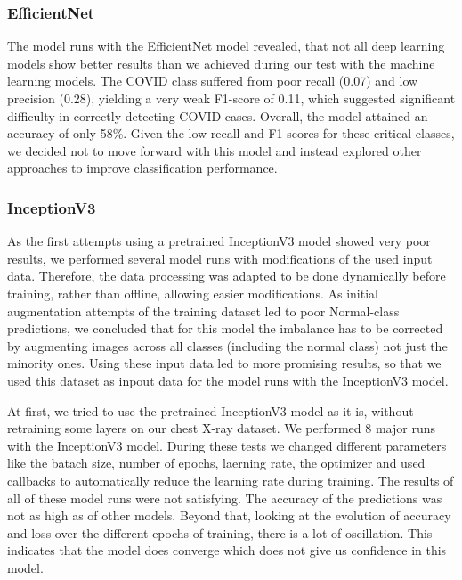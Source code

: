 \documentclass{article}
\begin{document}
\subsubsection{EfficientNet} 
The model runs with the EfficientNet model revealed, that not all deep learning models show better results than we achieved during our test with the machine learning models. 
The COVID class suffered from poor recall (0.07) and low precision (0.28), yielding a very weak F1-score of 0.11, which suggested significant difficulty in correctly detecting COVID cases. Overall, the model attained an accuracy of only 58\%. Given the low recall and F1-scores for these critical classes, we decided not to move forward with this model and instead explored other approaches to improve classification performance.


\subsubsection{InceptionV3} \label{section:InceptionV3}

As the first attempts using a pretrained InceptionV3 model showed very poor results, we performed several model runs with modifications of the used input data. Therefore, the data processing was adapted to be done dynamically before training, rather than offline, allowing easier modifications. As initial augmentation attempts of the training dataset led to poor Normal-class predictions, we concluded that for this model the imbalance has to be corrected by augmenting images across all classes (including the normal class) not just the minority ones. Using these input data led to more promising results, so that we used this dataset as inpout data for the model runs with the InceptionV3 model. 

At first, we tried to use the pretrained InceptionV3 model as it is, without retraining some layers on our chest X-ray dataset. We performed 8 major runs with the InceptionV3 model. During these tests we changed different parameters like the batach size, number of epochs, laerning rate, the optimizer and used callbacks to automatically reduce the learning rate during training. The results of all of these model runs were not satisfying. The accuracy of the predictions was not as high as of other models. Beyond that, looking at the evolution of accuracy and loss over the different epochs of training, there is a lot of oscillation. This indicates that the model does converge which does not give us confidence in this model. 
\end{document}
